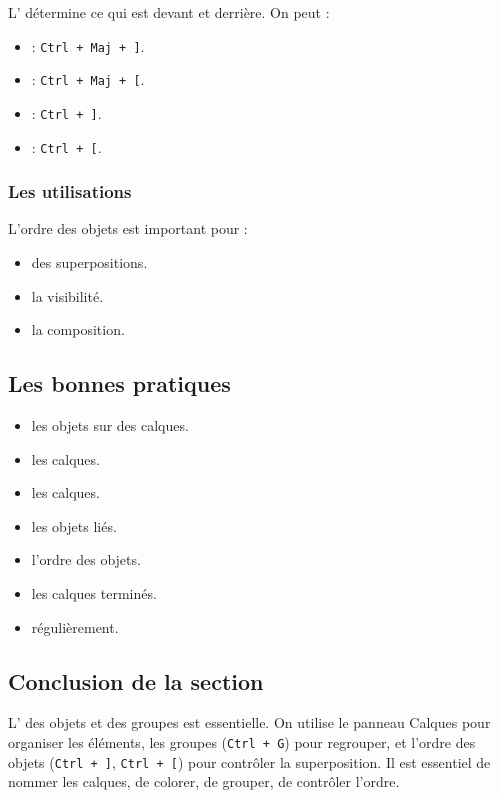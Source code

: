 L' détermine ce qui est devant et derrière. On peut :

\begin{itemize}
    \item {} : \texttt{Ctrl + Maj + ]}.
    \item {} : \texttt{Ctrl + Maj + [}.
    \item {} : \texttt{Ctrl + ]}.
    \item {} : \texttt{Ctrl + [}.
\end{itemize}

\subsubsection{Les utilisations}

L'ordre des objets est important pour :

\begin{itemize}
    \item {} des superpositions.
    \item {} la visibilité.
    \item {} la composition.
\end{itemize}

\subsection{Les bonnes pratiques}

\begin{itemize}
    \item {} les objets sur des calques.
    \item {} les calques.
    \item {} les calques.
    \item {} les objets liés.
    \item {} l'ordre des objets.
    \item {} les calques terminés.
    \item {} régulièrement.
\end{itemize}

\subsection*{Conclusion de la section}

L' des objets et des groupes est essentielle. On utilise le panneau Calques pour organiser les éléments, les groupes (\texttt{Ctrl + G}) pour regrouper, et l'ordre des objets (\texttt{Ctrl + ]}, \texttt{Ctrl + [}) pour contrôler la superposition. Il est essentiel de nommer les calques, de colorer, de grouper, de contrôler l'ordre.

